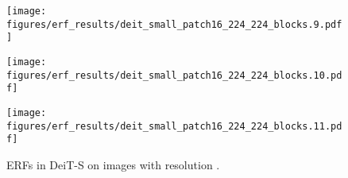 \documentclass{article}
\begin{document}
\begin{figure}[tb]
\begin{minipage}[t]{0.13\hsize}
    \label{figure:erf_deit:8}
  \end{minipage}
  \begin{minipage}[t]{0.13\hsize}
    \centering
    \texttt{[image: figures/erf\_results/deit\_small\_patch16\_224\_224\_blocks.9.pdf]}
    \label{figure:erf_deit:9}
  \end{minipage}
  \begin{minipage}[t]{0.13\hsize}
    \centering
    \texttt{[image: figures/erf\_results/deit\_small\_patch16\_224\_224\_blocks.10.pdf]}
    \label{figure:erf_deit:10}
  \end{minipage}
  \begin{minipage}[t]{0.13\hsize}
    \centering
    \texttt{[image: figures/erf\_results/deit\_small\_patch16\_224\_224\_blocks.11.pdf]}
    \label{figure:erf_deit:11}
  \end{minipage}
  \caption{ERFs in DeiT-S \cite{touvron2020training} on images with resolution .}
    \label{figure:erf_deit}
\end{figure} 
\end{document}
